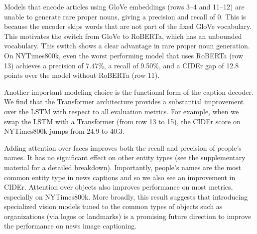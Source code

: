 Models that encode articles using GloVe embeddings (rows 3--4 and 11--12) are
unable to generate rare proper nouns, giving a precision and recall of 0. This
is because the encoder skips words that are not part of the fixed GloVe
vocabulary. This motivates the switch from GloVe to RoBERTa, which has an
unbounded vocabulary. This switch shows a clear advantage in rare proper noun
generation. On NYTimes800k, even the worst performing model that uses RoBERTa
(row 13) achieves a precision of 7.47\%, a recall of 9.50\%, and a CIDEr gap of
12.8 points over the model without RoBERTa (row 11).

Another important modeling choice is the functional form of the caption
decoder. We find that the Transformer architecture provides a substantial
improvement over the LSTM with respect to all evaluation metrics. For example,
when we swap the LSTM with a Transformer (from row 13 to 15), the CIDEr score
on NYTimes800k jumps from 24.9 to 40.3.


Adding attention over faces improves both the recall and precision of people's
names. It has no significant effect on other entity types (see the
supplementary material for a detailed breakdown). Importantly, people's names
are the most common entity type in news captions and so we also see an
improvement in CIDEr. Attention over objects also improves performance on most
metrics, especially on NYTimes800k. More broadly, this result suggests that
introducing specialized vision models tuned to the common types of objects such
as organizations (via logos or landmarks) is a promising future direction to
improve the performance on news image captioning.


